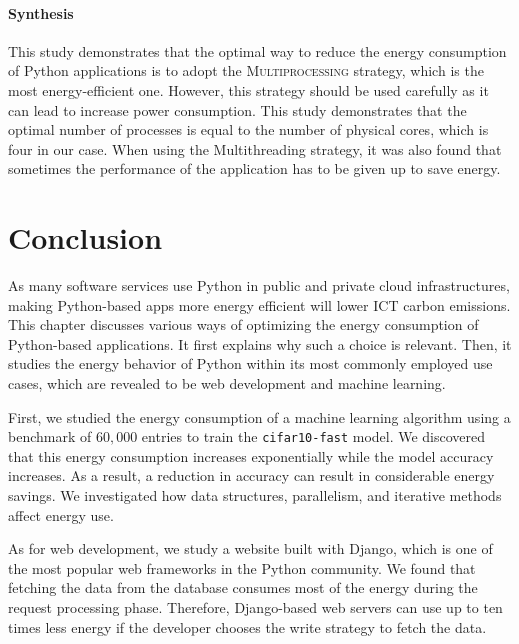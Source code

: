 \paragraph*{Synthesis}
This study demonstrates that the optimal way to reduce the energy consumption of Python applications is to adopt the \textsc{Multiprocessing} strategy, which is the most energy-efficient one.
However, this strategy should be used carefully as it can lead to increase power consumption.
This study demonstrates that the optimal number of processes is equal to the number of physical cores, which is four in our case.
When using the \textsf{Multithreading} strategy, it was also found that sometimes the performance of the application has to be given up to save energy.

\clearpage

\clearpage
\section{Conclusion}
As many software services use Python in public and private cloud infrastructures, making Python-based apps more energy efficient will lower ICT carbon emissions.
This chapter discusses various ways of optimizing the energy consumption of Python-based applications.
It first explains why such a choice is relevant.
Then, it studies the energy behavior of Python within its most commonly employed use cases, which are revealed to be web development and machine learning.

First, we studied the energy consumption of a machine learning algorithm using a benchmark of $60,000$ entries to train the \texttt{cifar10-fast} model.
We discovered that this energy consumption increases exponentially while the model accuracy increases.
As a result, a reduction in accuracy can result in considerable energy savings.
We investigated how data structures, parallelism, and iterative methods affect energy use.

As for web development, we study a website built with Django, which is one of the most popular web frameworks in the Python community.
We found that fetching the data from the database consumes most of the energy during the request processing phase.
Therefore, Django-based web servers can use up to ten times less energy if the developer chooses the write strategy to fetch the data.

